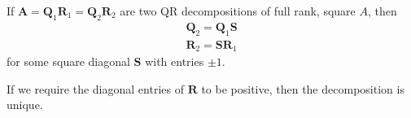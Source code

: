     

    








\begin{theorem}[$m=n $矩阵$A$进行QR分解的唯一性]
    If $ \boldsymbol{A}=\boldsymbol{Q}_{1} \boldsymbol{R}_{1}=\boldsymbol{Q}_{2} \boldsymbol{R}_{2} $ are two QR decompositions of full rank, square $ A $, then
$$
\begin{array}{l}
\boldsymbol{Q}_{2}=\boldsymbol{Q}_{1} \boldsymbol{S} \\
\boldsymbol{R}_{2}=\boldsymbol{S} \boldsymbol{R}_{1}
\end{array}
$$
for some square diagonal $ \boldsymbol{S} $ with entries $ \pm 1 $. 

If we require the diagonal entries of $ \boldsymbol{R} $ to be positive, then the decomposition is unique.
\end{theorem}

